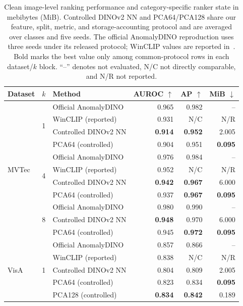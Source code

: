 \begin{table}[pos=t]
\centering
\caption{Clean image-level ranking performance and category-specific ranker state in mebibytes (MiB). Controlled DINOv2 NN and PCA64/PCA128 share our feature, split, metric, and storage-accounting protocol and are averaged over classes and five seeds. The official AnomalyDINO reproduction uses three seeds under its released protocol; WinCLIP values are reported in~\cite{winclip2023}. Bold marks the best value only among common-protocol rows in each dataset/$k$ block. ``--'' denotes not evaluated, N/C not directly comparable, and N/R not reported.}
\label{tab:clean-efficiency}
\setlength{\tabcolsep}{2.4pt}
\footnotesize
\begin{tabular}{lllrrr}
\toprule
Dataset & $k$ & Method & AUROC $\uparrow$ & AP $\uparrow$ & MiB $\downarrow$ \\
\midrule
\multirow{11}{*}{MVTec}
& \multirow{4}{*}{1} & Official AnomalyDINO & 0.965 & 0.982 & -- \\
& & WinCLIP (reported) & 0.931 & N/C & N/R \\
& & Controlled DINOv2 NN & \textbf{0.914} & \textbf{0.952} & 2.005 \\
& & PCA64 (controlled) & 0.904 & 0.951 & \textbf{0.095} \\
\cmidrule(lr){2-6}
& \multirow{4}{*}{4} & Official AnomalyDINO & 0.976 & 0.984 & -- \\
& & WinCLIP (reported) & 0.952 & N/C & N/R \\
& & Controlled DINOv2 NN & \textbf{0.942} & \textbf{0.967} & 6.000 \\
& & PCA64 (controlled) & 0.937 & \textbf{0.967} & \textbf{0.095} \\
\cmidrule(lr){2-6}
& \multirow{3}{*}{8} & Official AnomalyDINO & 0.980 & 0.990 & -- \\
& & Controlled DINOv2 NN & \textbf{0.948} & 0.970 & 6.000 \\
& & PCA64 (controlled) & 0.945 & \textbf{0.972} & \textbf{0.095} \\
\midrule
\multirow{14}{*}{VisA}
& \multirow{5}{*}{1} & Official AnomalyDINO & 0.857 & 0.866 & -- \\
& & WinCLIP (reported) & 0.838 & N/C & N/R \\
& & Controlled DINOv2 NN & 0.804 & 0.809 & 2.005 \\
& & PCA64 (controlled) & 0.823 & 0.834 & \textbf{0.095} \\
& & PCA128 (controlled) & \textbf{0.834} & \textbf{0.842} & 0.189 \\

\end{tabular}
\end{table}
